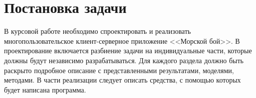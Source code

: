 \section{Постановка задачи}
 В курсовой работе необходимо спроектировать и реализовать
 многопользовательское клиент-серверное приложение <<Морской бой>>. В проектирование включается разбиение задачи на индивидуальные части, которые должны будут независимо разрабатываться.  Для каждого раздела должно быть раскрыто подробное описание с представленными результатами, моделями, методами. В части реализации следует описать средства, с помощью которых будет написана программа.

\endinput

